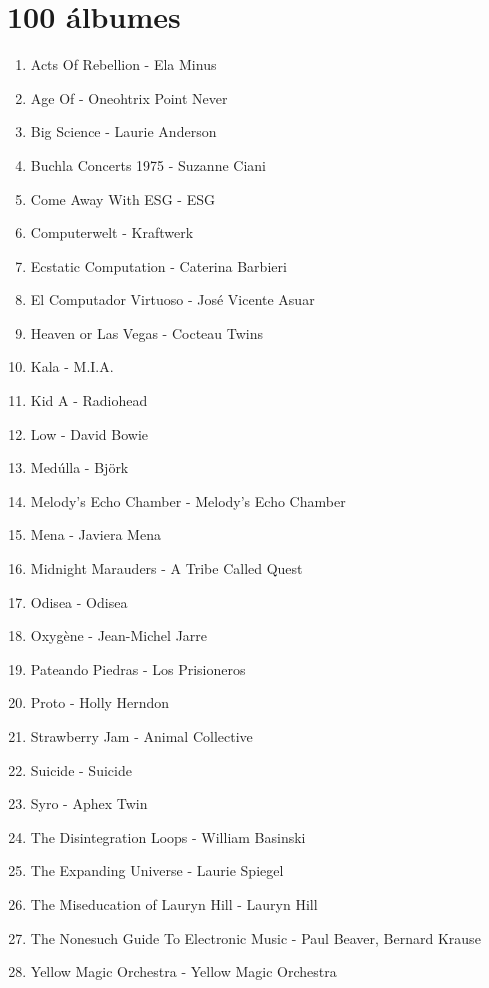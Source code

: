 \documentclass[../principal.tex]{subfiles}
\begin{document}
\chapter{100 álbumes}

\begin{enumerate}
    \item Acts Of Rebellion - Ela Minus
    \item Age Of - Oneohtrix Point Never
    \item Big Science - Laurie Anderson
    \item Buchla Concerts 1975 - Suzanne Ciani
    \item Come Away With ESG - ESG
    \item Computerwelt - Kraftwerk
    \item Ecstatic Computation - Caterina Barbieri
    \item El Computador Virtuoso - José Vicente Asuar
    \item Heaven or Las Vegas - Cocteau Twins
    \item Kala - M.I.A.
    \item Kid A - Radiohead
    \item Low - David Bowie
    \item Medúlla - Björk
    \item Melody's Echo Chamber - Melody's Echo Chamber
    \item Mena - Javiera Mena
    \item Midnight Marauders - A Tribe Called Quest
    \item Odisea - Odisea
    \item Oxygène - Jean-Michel Jarre
    \item Pateando Piedras - Los Prisioneros
    \item Proto - Holly Herndon
    \item Strawberry Jam - Animal Collective
    \item Suicide - Suicide
    \item Syro - Aphex Twin
    \item The Disintegration Loops - William Basinski
    \item The Expanding Universe - Laurie Spiegel
    \item The Miseducation of Lauryn Hill - Lauryn Hill
    \item The Nonesuch Guide To Electronic Music - Paul Beaver, Bernard Krause
    \item Yellow Magic Orchestra - Yellow Magic Orchestra

\end{enumerate}
\end{document}
